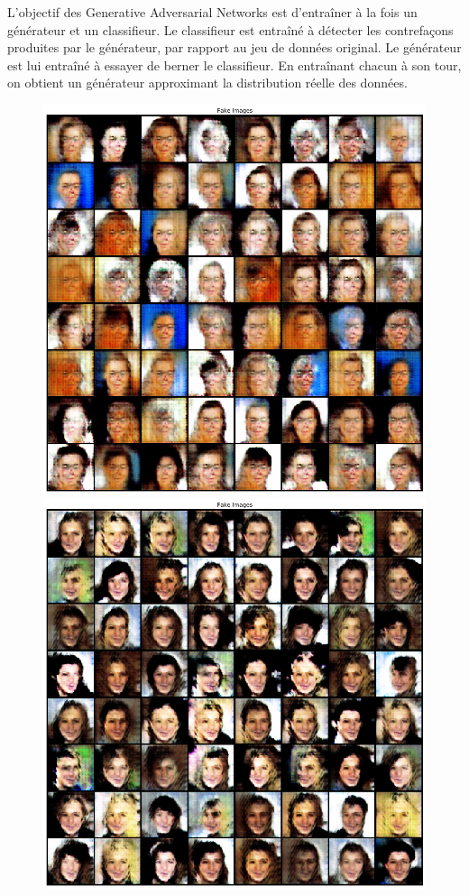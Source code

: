 \documentclass{standalone}
\begin{document}
	
	L'objectif des Generative Adversarial Networks est d'entraîner à la fois un générateur et un classifieur. Le classifieur est entraîné à détecter les contrefaçons produites par le générateur, par rapport au jeu de données original. Le générateur est lui entraîné à essayer de berner le classifieur. En entraînant chacun à son tour, on obtient un générateur approximant la distribution réelle des données.
	
	\begin{figure}[H]
		\center
		\includegraphics[scale=0.2]{img/faces2.png}
		\includegraphics[scale=0.2]{img/faces3.png}

\end{figure}
\end{document}
